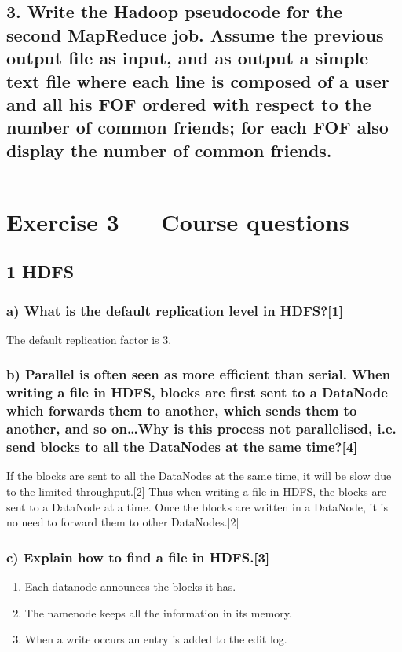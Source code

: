 \documentclass[11pt,a4paper]{article}
\begin{document}
\inputminted{java}{../src/main/java/com/ve572/e1/FindFOF.java}

\subsection*{3. Write the Hadoop pseudocode
for the second MapReduce job. Assume the previous output
file as input, and as output a simple text file where each line is composed of a user and all his
FOF ordered with respect to the number of common friends; for each FOF also display the
number of common friends.}


\inputminted{java}{../src/main/java/com/ve572/e1/CountFOF.java}

\section*{Exercise 3 --- Course questions}
\subsection*{1 HDFS}
\subsubsection*{a) What is the default replication level in HDFS?[1]}
The default replication factor is 3.
\subsubsection*{b) Parallel is often seen as more efficient than serial. When writing a file in HDFS, blocks are first sent to a DataNode which forwards them to another, which sends them to another, and so on…Why is this process not parallelised, i.e. send blocks to all the DataNodes at the same time?[4]}
If the blocks are sent to all the DataNodes at the same time, it will be slow due to the limited throughput.[2] Thus when writing a file in HDFS, the blocks are sent to a DataNode at a time. Once the blocks are written in a DataNode, it is no need to forward them to other DataNodes.[2]

\subsubsection*{c) Explain how to find a file in HDFS.[3]}
\begin{enumerate}
	\item Each datanode announces the blocks it has. 
	\item The namenode keeps all the information in its memory. 
	\item When a write occurs an entry is added to the edit log.
\end{enumerate}
\end{document}
